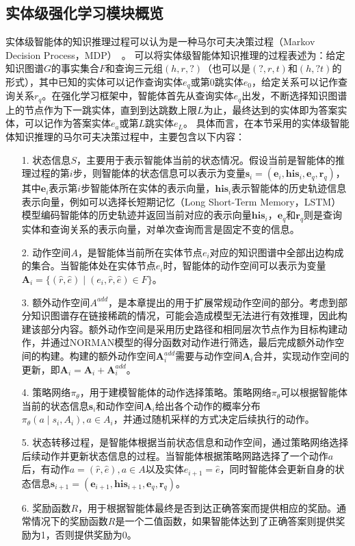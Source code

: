 \documentclass[algorithmlist, AutoFakeBold, AutoFakeSlant, figurelist, tablelist, nomlist, engineering]{seuthesix}
\begin{document}
\subsection{实体级强化学习模块概览}
实体级智能体的知识推理过程可以认为是一种马尔可夫决策过程（Markov Decision Process，MDP）~\cite{gronauer2022multi}。
可以将实体级智能体知识推理的过程表述为：给定知识图谱$G$的事实集合$F$和查询三元组$(h, r, ?)$（也可以是$(?, r, t)$和$(h, ? t)$的形式），其中已知的实体可以记作查询实体$e_q$或第0跳实体$e_0$，给定关系可以记作查询关系$r_q$。在强化学习框架中，智能体首先从查询实体$e_q$出发，不断选择知识图谱上的节点作为下一跳实体，直到到达跳数上限$L$为止，最终达到的实体即为答案实体，可以记作为答案实体$e_a$或第$L$跳实体$e_L$。
具体而言，在本节采用的实体级智能体知识推理的马尔可夫决策过程中，主要包含以下内容：
\begin{itemize}
  \item [1.] 状态信息$S$，主要用于表示智能体当前的状态情况。假设当前是智能体的推理过程的第$i$步，则智能体的状态信息可以表示为变量$\bm{s}_i = (\bm{e}_i, \bm{his}_i, \bm{e}_q, \bm{r}_q)$，其中$\bm{e}_i$表示第$i$步智能体所在实体的表示向量，$\bm{his}_i$表示智能体的历史轨迹信息表示向量，例如可以选择长短期记忆（Long Short-Term Memory，LSTM）模型编码智能体的历史轨迹并返回当前对应的表示向量$\bm{his}_i$，$\bm{e}_q$和$\bm{r}_q$则是查询实体和查询关系的表示向量，对单次查询而言是固定不变的信息。
  \item [2.] 动作空间$A$，是智能体当前所在实体节点$e_i$对应的知识图谱中全部出边构成的集合。当智能体处在实体节点$e_i$时，智能体的动作空间可以表示为变量$\bm{A}_i = \{(\hat{r}, \hat{e}) \mid (e_i, \hat{r}, \hat{e}) \in F\}$。
  \item [3.] 额外动作空间$A^{add}$，是本章提出的用于扩展常规动作空间的部分。考虑到部分知识图谱存在链接稀疏的情况，可能会造成模型无法进行有效推理，因此构建该部分内容。额外动作空间是采用历史路径和相同层次节点作为目标构建动作，并通过NORMAN模型的得分函数对动作进行筛选，最后完成额外动作空间的构建。构建的额外动作空间$\bm{A}_{i}^{add}$需要与动作空间$\bm{A}_i$合并，实现动作空间的更新，即$\bm{A}_i = \bm{A}_i + \bm{A}_{i}^{add} $。
  \item [4.] 策略网络$\pi_\theta$，用于建模智能体的动作选择策略。策略网络$\pi_\theta$可以根据智能体当前的状态信息$\bm{s}_i$和动作空间$\bm{A}_i$给出各个动作的概率分布$\pi_\theta(a \mid s_i, A_i), a \in A_i$，并通过随机采样的方式决定后续执行的动作。
  \item [5.] 状态转移过程，是智能体根据当前状态信息和动作空间，通过策略网络选择后续动作并更新状态信息的过程。当智能体根据策略网路选择了一个动作$a$后，有动作$a = (\hat{r}, \hat{e}), a \in A$以及实体$e_{i+1}=\hat{e}$，同时智能体会更新自身的状态信息$\bm{s}_{i+1} = (\bm{e}_{i+1}, \bm{his}_{i+1}, \bm{e}_q, \bm{r}_q)$。
  \item [6.] 奖励函数$R$，用于根据智能体最终是否到达正确答案而提供相应的奖励。通常情况下的奖励函数$R$是一个二值函数，如果智能体达到了正确答案则提供奖励为1，否则提供奖励为0。
\end{itemize}
\end{document}
